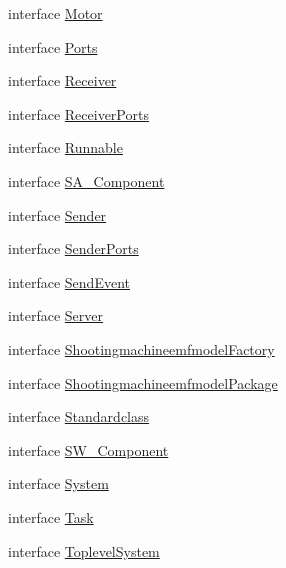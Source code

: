 \begin{DoxyCompactItemize}
interface \hyperlink{interfaceshootingmachineemfmodel_1_1_motor}{Motor}
\item 
interface \hyperlink{interfaceshootingmachineemfmodel_1_1_ports}{Ports}
\item 
interface \hyperlink{interfaceshootingmachineemfmodel_1_1_receiver}{Receiver}
\item 
interface \hyperlink{interfaceshootingmachineemfmodel_1_1_receiver_ports}{Receiver\-Ports}
\item 
interface \hyperlink{interfaceshootingmachineemfmodel_1_1_runnable}{Runnable}
\item 
interface \hyperlink{interfaceshootingmachineemfmodel_1_1_s_a___component}{S\-A\-\_\-\-Component}
\item 
interface \hyperlink{interfaceshootingmachineemfmodel_1_1_sender}{Sender}
\item 
interface \hyperlink{interfaceshootingmachineemfmodel_1_1_sender_ports}{Sender\-Ports}
\item 
interface \hyperlink{interfaceshootingmachineemfmodel_1_1_send_event}{Send\-Event}
\item 
interface \hyperlink{interfaceshootingmachineemfmodel_1_1_server}{Server}
\item 
interface \hyperlink{interfaceshootingmachineemfmodel_1_1_shootingmachineemfmodel_factory}{Shootingmachineemfmodel\-Factory}
\item 
interface \hyperlink{interfaceshootingmachineemfmodel_1_1_shootingmachineemfmodel_package}{Shootingmachineemfmodel\-Package}
\item 
interface \hyperlink{interfaceshootingmachineemfmodel_1_1_standardclass}{Standardclass}
\item 
interface \hyperlink{interfaceshootingmachineemfmodel_1_1_s_w___component}{S\-W\-\_\-\-Component}
\item 
interface \hyperlink{interfaceshootingmachineemfmodel_1_1_system}{System}
\item 
interface \hyperlink{interfaceshootingmachineemfmodel_1_1_task}{Task}
\item 
interface \hyperlink{interfaceshootingmachineemfmodel_1_1_toplevel_system}{Toplevel\-System}
\end{DoxyCompactItemize}
